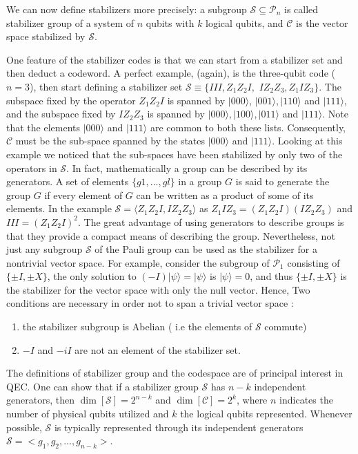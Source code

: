 We can now define stabilizers more precisely: a subgroup $\mathcal{S} \subseteq \mathcal{P}_{n}$ is called stabilizer group of a system of $n$ qubits with $k$ logical qubits, and $\mathcal{C}$ is the vector space stabilized by $\mathcal{S}$.  

One feature of the stabilizer codes is that we can start from a stabilizer set and then deduct a codeword.
A perfect example, (again), is the three-qubit code ($n=3$), then start defining a stabilizer set $\mathcal{S} \equiv \{III,Z_1Z_2I,$ $IZ_2Z_3,Z_1IZ_3\}$. 
The subspace fixed by the operator $Z_1Z_2I$ is spanned by $|000\rangle$, $|001\rangle,|110\rangle$ and $|111\rangle$, and the subspace fixed by $IZ_{2} Z_{3}$ is spanned by $|000\rangle,|100\rangle,|011\rangle$ and $|111\rangle$. 
Note that the elements $|000\rangle$ and $|111\rangle$ are common to both these lists. Consequently, $\mathcal{C}$ must be the sub-space spanned by the states $|000\rangle$ and $|111\rangle$. 
Looking at this example we noticed that the sub-spaces have been stabilized by only two of the operators in $\mathcal{S}$.
In fact, mathematically a group can be described by its generators.
A set of elements $\{g1,...,gl\}$ in a group $G$ is said to generate the group $G$ if every element of $G$ can be written as a product of some of its elements. In the example $\mathcal{S}= \langle Z_1Z_2I,IZ_2Z_3\rangle$ as $Z_1IZ_3 = (Z_1Z_2I)(IZ_2Z_3)$ and $III = (Z_1Z_2I)^2$.
The great advantage of using generators to describe groups is that they provide a compact means of describing the group.
Nevertheless, not just any subgroup $\mathcal{S}$ of the Pauli group can be used as the stabilizer for a nontrivial vector space. For example, consider the subgroup of $\mathcal{P}_{1}$ consisting of $\{\pm I, \pm X\}$, the only solution to $(-I)|\psi\rangle=|\psi\rangle$ is $|\psi\rangle=0$, and thus $\{\pm I, \pm X\}$ is the stabilizer for the vector space with only the null vector. Hence, Two conditions are necessary in order not to span a trivial vector space :
\begin{enumerate}
    \item the stabilizer subgroup is Abelian ( i.e the elements of $\mathcal{S}$ commute)
    \item $-I$ and $-iI$ are not an element of the stabilizer set.
\end{enumerate}  

The definitions of stabilizer group and the codespace are of principal interest in QEC. 
One can show that if a stabilizer group $\mathcal{S}$ has $n-k$ independent generators, then $\operatorname{dim}[\mathcal{S}]=2^{n-k}$ and $\operatorname{dim}\left[\mathcal{C}\right]=2^{k}$, where $n$ indicates the number of physical qubits utilized and $k$ the logical qubits represented. %
Whenever possible, $\mathcal{S}$ is typically represented through its independent generators $\mathcal{S}=<g_{1}, g_{2}, \ldots, g_{n-k}>$.





